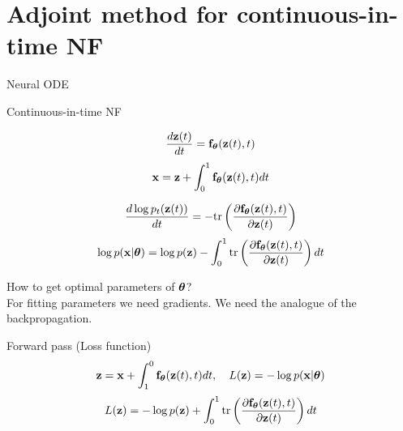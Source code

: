 \section{Adjoint method for continuous-in-time NF}
\begin{frame}{Neural ODE}
	\begin{block}{Continuous-in-time NF}
		{\small
		\begin{minipage}[t]{0.4\columnwidth}
			\[
	 			 \frac{d \mathbf{z}(t)}{dt} = \mathbf{f}_{\boldsymbol{\theta}}(\mathbf{z}(t), t) 	 
	 		\]
	 		\[
	 			 \mathbf{x} = \mathbf{z} + \int_{0}^{1} \mathbf{f}_{\boldsymbol{\theta}}(\mathbf{z}(t), t) dt 
			\]
		\end{minipage}%
		\begin{minipage}[t]{0.6\columnwidth}
			\vspace{-0.4cm}
			\[
					\frac{d \log p_t(\mathbf{z}(t))}{d t} = - \text{tr} \left( \frac{\partial \mathbf{f}_{\boldsymbol{\theta}}(\mathbf{z}(t), t)}{\partial \mathbf{z}(t)} \right) 
	 		\]
	 		\[
					\log p(\mathbf{x} | \boldsymbol{\theta}) = \log p(\mathbf{z}) - \int_{0}^{1} \text{tr} \left( \frac{\partial \mathbf{f}_{\boldsymbol{\theta}}(\mathbf{z}(t), t)}{\partial \mathbf{z}(t)} \right) dt
			\]
		\end{minipage}
		}
	\end{block}
	How to get optimal parameters of $\boldsymbol{\theta}$? \\
	
	For fitting parameters we need gradients. We need the analogue of the backpropagation.
	\begin{block}{Forward pass (Loss function)}
		\vspace{-0.3cm}
		\[
			\mathbf{z} = \mathbf{x} + \int_{1}^{0} \mathbf{f}_{\boldsymbol{\theta}}(\mathbf{z}(t), t) dt, \quad L(\mathbf{z}) = - \log p(\mathbf{x} | \boldsymbol{\theta})
		\]
		\[
			L(\mathbf{z}) = - \log p(\mathbf{z}) + \int_{0}^{1} \text{tr} \left( \frac{\partial \mathbf{f}_{\boldsymbol{\theta}}(\mathbf{z}(t), t)}{\partial \mathbf{z}(t)} \right) dt
		\]
	\end{block}
\end{frame}
